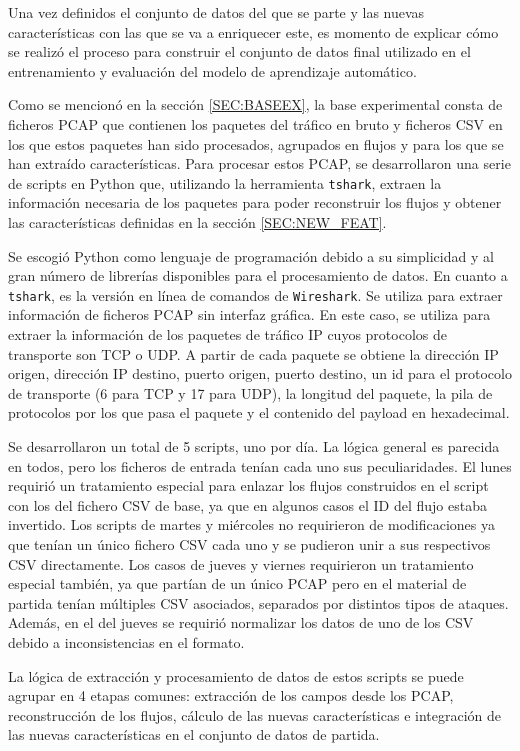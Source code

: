 Una vez definidos el conjunto de datos del que se parte y las nuevas características con las que se va a enriquecer este, es momento de explicar cómo se realizó el proceso para construir el conjunto de datos final utilizado en el entrenamiento y evaluación del modelo de aprendizaje automático.

Como se mencionó en la sección \ref{SEC:BASEEX}, la base experimental consta de ficheros PCAP que contienen los paquetes del tráfico en bruto y ficheros CSV en los que estos paquetes han sido procesados, agrupados en flujos y para los que se han extraído características. Para procesar estos PCAP, se desarrollaron una serie de scripts en Python que, utilizando la herramienta \texttt{tshark}, extraen la información necesaria de los paquetes para poder reconstruir los flujos y obtener las características definidas en la sección \ref{SEC:NEW_FEAT}.

Se escogió Python como lenguaje de programación debido a su simplicidad y al gran número de librerías disponibles para el procesamiento de datos. En cuanto a \texttt{tshark}, es la versión en línea de comandos de \texttt{Wireshark}. Se utiliza para extraer información de ficheros PCAP sin interfaz gráfica. En este caso, se utiliza para extraer la información de los paquetes de tráfico IP cuyos protocolos de transporte son TCP o UDP. A partir de cada paquete se obtiene la dirección IP origen, dirección IP destino, puerto origen, puerto destino, un id para el protocolo de transporte (6 para TCP y 17 para UDP), la longitud del paquete, la pila de protocolos por los que pasa el paquete y el contenido del payload en hexadecimal. 

Se desarrollaron un total de 5 scripts, uno por día. La lógica general es parecida en todos, pero los ficheros de entrada tenían cada uno sus peculiaridades. El lunes requirió un tratamiento especial para enlazar los flujos construidos en el script con los del fichero CSV de base, ya que en algunos casos el ID del flujo estaba invertido. Los scripts de martes y miércoles no requirieron de modificaciones ya que tenían un único fichero CSV cada uno y se pudieron unir a sus respectivos CSV directamente. Los casos de jueves y viernes requirieron un tratamiento especial también, ya que partían de un único PCAP pero en el material de partida tenían múltiples CSV asociados, separados por distintos tipos de ataques. Además, en el del jueves se requirió normalizar los datos de uno de los CSV debido a inconsistencias en el formato.

La lógica de extracción y procesamiento de datos de estos scripts se puede agrupar en 4 etapas comunes: extracción de los campos desde los PCAP, reconstrucción de los flujos, cálculo de las nuevas características e integración de las nuevas características en el conjunto de datos de partida.

